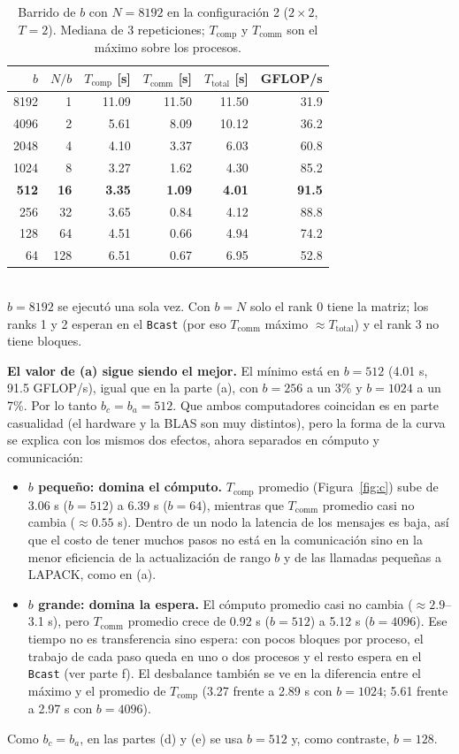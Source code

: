 \documentclass[11pt,a4paper]{article}
\newcommand{\Tcomp}{T_{\text{comp}}}
\newcommand{\Tcomm}{T_{\text{comm}}}
\newcommand{\Ttot}{T_{\text{total}}}
\begin{document}
\begin{table}[H]
\centering\small
\caption{Barrido de $b$ con $N=8192$ en la configuración 2 ($2\times2$, $T=2$). Mediana de 3 repeticiones; $\Tcomp$ y $\Tcomm$ son el máximo sobre los procesos.}
\label{tab:c}
\begin{tabular}{rrrrrr}
\toprule
$b$ & $N/b$ & $\Tcomp$ [s] & $\Tcomm$ [s] & $\Ttot$ [s] & GFLOP/s \\
\midrule
8192 & 1   & 11.09 & 11.50 & 11.50 & 31.9 \\
4096 & 2   & 5.61 & 8.09 & 10.12 & 36.2 \\
2048 & 4   & 4.10 & 3.37 & 6.03 & 60.8 \\
1024 & 8   & 3.27 & 1.62 & 4.30 & 85.2 \\
\textbf{512} & \textbf{16} & \textbf{3.35} & \textbf{1.09} & \textbf{4.01} & \textbf{91.5} \\
256  & 32  & 3.65 & 0.84 & 4.12 & 88.8 \\
128  & 64  & 4.51 & 0.66 & 4.94 & 74.2 \\
64   & 128 & 6.51 & 0.67 & 6.95 & 52.8 \\
\bottomrule
\end{tabular}\\[2pt]
{\footnotesize $b=8192$ se ejecutó una sola vez. Con $b=N$ solo el rank 0 tiene la matriz; los ranks 1 y 2 esperan en el \texttt{Bcast} (por eso $\Tcomm$ máximo $\approx\Ttot$) y el rank 3 no tiene bloques.}
\end{table}

\textbf{El valor de (a) sigue siendo el mejor.} El mínimo está en $b=512$ (4.01 s, 91.5 GFLOP/s), igual que en la parte (a), con $b=256$ a un 3\% y $b=1024$ a un 7\%. Por lo tanto $b_c=b_a=512$. Que ambos computadores coincidan es en parte casualidad (el hardware y la BLAS son muy distintos), pero la forma de la curva se explica con los mismos dos efectos, ahora separados en cómputo y comunicación:
\begin{itemize}
  \item \textbf{$b$ pequeño: domina el cómputo.} $\Tcomp$ promedio (Figura~\ref{fig:c}) sube de 3.06 s ($b=512$) a 6.39 s ($b=64$), mientras que $\Tcomm$ promedio casi no cambia ($\approx0.55$ s). Dentro de un nodo la latencia de los mensajes es baja, así que el costo de tener muchos pasos no está en la comunicación sino en la menor eficiencia de la actualización de rango $b$ y de las llamadas pequeñas a LAPACK, como en (a).
  \item \textbf{$b$ grande: domina la espera.} El cómputo promedio casi no cambia ($\approx2.9$--3.1 s), pero $\Tcomm$ promedio crece de 0.92 s ($b=512$) a 5.12 s ($b=4096$). Ese tiempo no es transferencia sino espera: con pocos bloques por proceso, el trabajo de cada paso queda en uno o dos procesos y el resto espera en el \texttt{Bcast} (ver parte f). El desbalance también se ve en la diferencia entre el máximo y el promedio de $\Tcomp$ (3.27 frente a 2.89 s con $b=1024$; 5.61 frente a 2.97 s con $b=4096$).
\end{itemize}
Como $b_c=b_a$, en las partes (d) y (e) se usa $b=512$ y, como contraste, $b=128$.
\end{document}
